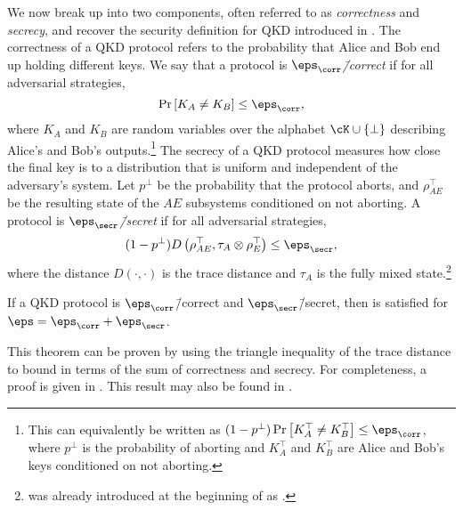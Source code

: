 We now break  up into two components, often referred to as \emph{correctness} and \emph{secrecy}, and recover the security definition for QKD introduced in \textcite{RK05,BHLMO05,Ren05}. The correctness of a QKD protocol refers to the probability that Alice and Bob end up holding different keys. We say that a protocol is \emph{$\eps_{\corr}$\=/correct} if for all adversarial strategies,
\begin{equation}
  \label{eq:qkd.cor}
  \Pr \left[ K_A \neq K_B \right] \leq \eps_{\corr},
\end{equation}
where $K_A$ and $K_B$ are random variables over the alphabet $\cK \cup \{\bot\}$ describing Alice's and Bob's outputs.\footnote{This can  equivalently be written as $(1-p^\bot)\Pr \left[ K^\top_A \neq     K^\top_B \right] \leq \eps_{\corr}$, where $p^\bot$ is the   probability of aborting and $K^\top_A$ and $K^\top_B$ are Alice and   Bob's keys conditioned on not aborting.} The secrecy of a QKD protocol measures how close the final key is to a distribution that is uniform and independent of the adversary's system. Let $p^\bot$ be the probability that the protocol aborts, and $\rho^\top_{AE}$ be the resulting state of the $AE$ subsystems conditioned on not aborting. A protocol is \emph{$\eps_{\secr}$\=/secret} if for all adversarial strategies,
\begin{equation}
  \label{eq:qkd.sec}
  (1-p^\bot) D\left(\rho^\top_{AE},\tau_A \otimes \rho^{\top}_E\right)
  \leq \eps_{\secr},
\end{equation}
where the distance $D(\cdot,\cdot)$ is the trace distance and $\tau_A$
is the fully mixed state.\footnote{ was already
  introduced at the beginning of  as .}

\begin{thm}
  \label{thm:qkd}
  If a QKD protocol is $\eps_{\corr}$\=/correct and
  $\eps_{\secr}$\=/secret, then  is satisfied
  for $\eps = \eps_{\corr} + \eps_{\secr}$.
\end{thm}

This theorem can be proven by using the triangle inequality of the
trace distance to bound  in terms of the sum
of correctness and secrecy. For completeness, a proof is given in
. This result may also be found in
\textcite{BHLMO05}.

